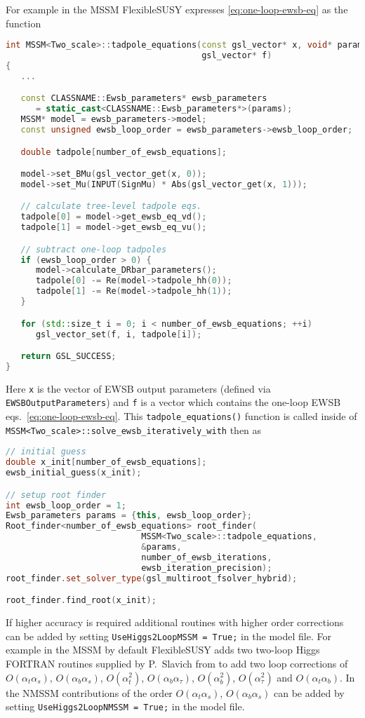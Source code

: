 \documentclass[final,3p,11pt,pdflatex]{elsarticle}
\newcommand{\fs}{FlexibleSUSY\xspace}
\newcommand{\code}[1]{\lstinline|#1|}  %
\def\at{\alpha_t}
\def\ab{\alpha_b}
\def\as{\alpha_s}
\def\atau{\alpha_{\tau}}
\def\oatab{O(\at\ab)}
\def\oatas{O(\at\as)}
\def\oabas{O(\ab\as)}
\def\oatq{O(\at^2)}
\def\oabq{O(\ab^2)}
\def\oatauq{O(\atau^2)}
\def\oabatau{O(\ab \atau)}
\begin{document}
For example in the MSSM \fs expresses \eqref{eq:one-loop-ewsb-eq} as
the function
%
\begin{lstlisting}[language=C++]
int MSSM<Two_scale>::tadpole_equations(const gsl_vector* x, void* params,
                                       gsl_vector* f)
{
   ...

   const CLASSNAME::Ewsb_parameters* ewsb_parameters
      = static_cast<CLASSNAME::Ewsb_parameters*>(params);
   MSSM* model = ewsb_parameters->model;
   const unsigned ewsb_loop_order = ewsb_parameters->ewsb_loop_order;

   double tadpole[number_of_ewsb_equations];

   model->set_BMu(gsl_vector_get(x, 0));
   model->set_Mu(INPUT(SignMu) * Abs(gsl_vector_get(x, 1)));

   // calculate tree-level tadpole eqs.
   tadpole[0] = model->get_ewsb_eq_vd();
   tadpole[1] = model->get_ewsb_eq_vu();

   // subtract one-loop tadpoles
   if (ewsb_loop_order > 0) {
      model->calculate_DRbar_parameters();
      tadpole[0] -= Re(model->tadpole_hh(0));
      tadpole[1] -= Re(model->tadpole_hh(1));
   }

   for (std::size_t i = 0; i < number_of_ewsb_equations; ++i)
      gsl_vector_set(f, i, tadpole[i]);

   return GSL_SUCCESS;
}
\end{lstlisting}
%
Here \code{x} is the vector of EWSB output parameters (defined via
\code{EWSBOutputParameters}) and \code{f} is a vector which contains
the one-loop EWSB eqs.\ \eqref{eq:one-loop-ewsb-eq}.  This
\code{tadpole_equations()} function is called inside of
\code{MSSM<Two_scale>::solve_ewsb_iteratively_with} then as
%
\begin{lstlisting}[language=C++]
// initial guess
double x_init[number_of_ewsb_equations];
ewsb_initial_guess(x_init);

// setup root finder
int ewsb_loop_order = 1;
Ewsb_parameters params = {this, ewsb_loop_order};
Root_finder<number_of_ewsb_equations> root_finder(
                           MSSM<Two_scale>::tadpole_equations,
                           &params,
                           number_of_ewsb_iterations,
                           ewsb_iteration_precision);
root_finder.set_solver_type(gsl_multiroot_fsolver_hybrid);

root_finder.find_root(x_init);
\end{lstlisting}

If higher accuracy is required additional routines with higher order
corrections can be added by setting \code{UseHiggs2LoopMSSM = True;}
in the model file.  For example in the MSSM by default \fs adds two
two-loop Higgs FORTRAN routines supplied by P.~Slavich from
\cite{Degrassi:2001yf,Brignole:2001jy,Dedes:2002dy,Brignole:2002bz,Dedes:2003km}
to add two loop corrections of $\oatas$, $\oabas$, $\oatq$,
$\oabatau$, $\oabq$, $\oatauq$ and $\oatab$.  In the NMSSM
contributions of the order $\oatas$, $\oabas$ \cite{Degrassi:2009yq}
can be added by setting \code{UseHiggs2LoopNMSSM = True;} in the model
file.
\end{document}
